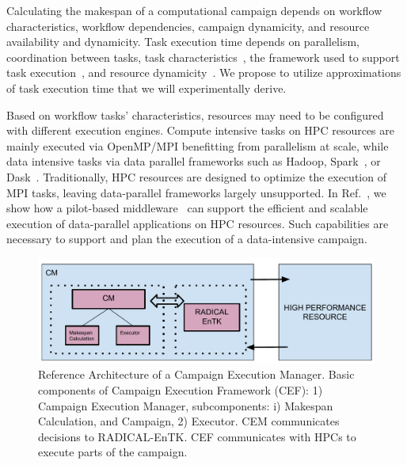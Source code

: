 Calculating the makespan of a computational campaign depends on workflow characteristics, workflow dependencies, campaign dynamicity, and resource availability and dynamicity. Task execution time depends on parallelism, coordination between tasks, task characteristics~\cite{khoshlessan2017parallel}, the framework used to support task execution~\cite{paraskevakos2018task}, and resource dynamicity~\cite{paraskevakos2019workflow}. We propose to utilize approximations of task execution time that we will experimentally derive.

Based on workflow tasks’ characteristics, resources may need to be configured with different execution engines. Compute intensive tasks on HPC resources are mainly executed via OpenMP/MPI benefitting from parallelism at scale, while data intensive tasks via data parallel frameworks such as Hadoop, Spark~\cite{zaharia2010spark}, or Dask~\cite{rocklin2015dask}. Traditionally, HPC resources are designed to optimize the execution of MPI tasks, leaving data-parallel frameworks largely unsupported. In Ref.~\cite{luckow2016hadoop}, we show how a pilot-based middleware~\cite{merzky2019using} can support the efficient and scalable execution of data-parallel applications on HPC resources. Such capabilities are necessary to support and plan the execution of a data-intensive campaign.


\begin{figure}[t]
	\centering
	\includegraphics[width=.85\textwidth]{Proposal/extended_abstract/CEM_RefArch.pdf}
	\caption{Reference Architecture of a Campaign Execution Manager. Basic components of Campaign Execution Framework (CEF): 1) Campaign Execution Manager, subcomponents: i) Makespan Calculation, and Campaign, 2) Executor. CEM communicates decisions to RADICAL-EnTK. CEF communicates with HPCs to execute parts of the campaign.}\label{refarch}
\end{figure}

